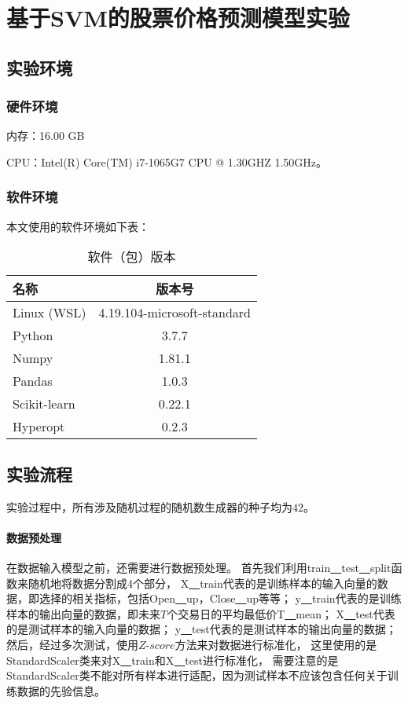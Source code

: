 \chapter{基于SVM的股票价格预测模型实验}

\section{实验环境}

\subsection{硬件环境}

内存：16.00 GB

CPU：Intel(R) Core(TM) i7-1065G7 CPU @ 1.30GHZ 1.50GHz。

\subsection{软件环境}
本文使用的软件环境如下表：
\begin{table}[ht]
    \centering
    \caption{软件（包）版本}
    \begin{tabular}{lc}
        \hline
        {名称} & {版本号}\\
        \hline
        {Linux (WSL)} & {4.19.104-microsoft-standard}\\
        {Python} & {3.7.7}\\
        {Numpy} & {1.81.1}\\
        {Pandas} & {1.0.3}\\
        {Scikit-learn} & {0.22.1}\\
        {Hyperopt} & {0.2.3}
    \end{tabular}
\end{table}

\section{实验流程}

实验过程中，所有涉及随机过程的随机数生成器的种子均为$42$。

\subsubsection{数据预处理}

在数据输入模型之前，还需要进行数据预处理。
首先我们利用train\underline{~~}test\underline{~~}split函数来随机地将数据分割成4个部分，
X\underline{~~}train代表的是训练样本的输入向量的数据，即选择的相关指标，包括Open\underline{~~}up，Close\underline{~~}up等等；
y\underline{~~}train代表的是训练样本的输出向量的数据，即未来$T$个交易日的平均最低价T\underline{~~}mean；
X\underline{~~}test代表的是测试样本的输入向量的数据；
y\underline{~~}test代表的是测试样本的输出向量的数据；
然后，经过多次测试，使用$Z\text{-}score$方法来对数据进行标准化，
这里使用的是StandardScaler类来对X\underline{~~}train和X\underline{~~}test进行标准化，
需要注意的是StandardScaler类不能对所有样本进行适配，因为测试样本不应该包含任何关于训练数据的先验信息。

